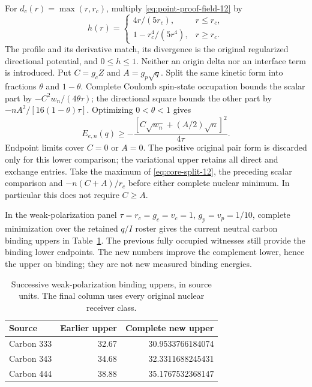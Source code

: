 For $d_c(r)=\max(r,r_c)$, multiply
\eqref{eq:point-proof-field-12} by
\begin{equation}
 h(r)=\begin{cases}4r/(5r_c),&r\le r_c,\\
                 1-r_c^4/(5r^4),&r\ge r_c.
       \end{cases}
\end{equation}
The profile and its derivative match, its divergence is the original
regularized directional potential, and $0\le h\le1$. Neither an origin
delta nor an interface term is introduced. Put $C=g_cZ$ and
$A=g_p\sqrt q$. Split the same kinetic form into fractions $\theta$ and
$1-\theta$. Complete Coulomb spin-state occupation bounds the scalar part
by $-C^2w_n/(4\theta\tau)$; the directional square bounds the other part
by $-nA^2/[16(1-\theta)\tau]$. Optimizing $0<\theta<1$ gives
\begin{equation}
 E_{e,n}(q)\ge-\frac{[C\sqrt{w_n}+(A/2)\sqrt n]^2}{4\tau}.
\label{eq:core-split-12}
\end{equation}
Endpoint limits cover $C=0$ or $A=0$. The positive original pair form is
discarded only for this lower comparison; the variational upper retains
all direct and exchange entries. Take the maximum of
\eqref{eq:core-split-12}, the preceding scalar comparison and
$-n(C+A)/r_c$ before either complete nuclear minimum. In particular this
does not require $C\ge A$.

In the weak-polarization panel $\tau=r_c=g_c=v_c=1$,
$g_p=v_p=1/10$, complete minimization over the retained $q/I$ roster gives
the current neutral carbon binding uppers in
Table~\ref{tab:carbon-upgrade-12}. The previous fully occupied witnesses
still provide the binding lower endpoints. The new numbers improve the
complement lower, hence the upper on binding; they are not new measured
binding energies.

\begin{table}[htbp]\centering\small
\caption{Successive weak-polarization binding uppers, in source units.
The final column uses every original nuclear receiver class.}
\begin{tabular}{lrr}\toprule
Source & Earlier upper & Complete new upper\\\midrule
Carbon 333&32.67&30.9533766184074\\
Carbon 343&34.68&32.3311688245431\\
Carbon 444&38.88&35.1767532368147\\\bottomrule
\end{tabular}\label{tab:carbon-upgrade-12}
\end{table}

